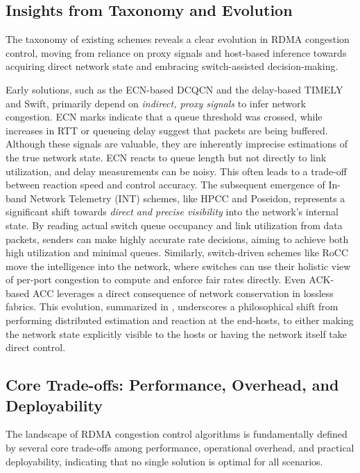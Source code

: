 \documentclass[11pt,en]{elegantpaper}
\begin{document}
\subsection{Insights from Taxonomy and Evolution}
\label{subsec:insights}

The taxonomy of existing schemes reveals a clear evolution in RDMA congestion control, moving from reliance on proxy signals and host-based inference towards acquiring direct network state and embracing switch-assisted decision-making.

Early solutions, such as the ECN-based DCQCN and the delay-based TIMELY and Swift, primarily depend on \textit{indirect, proxy signals} to infer network congestion. ECN marks indicate that a queue threshold was crossed, while increases in RTT or queueing delay suggest that packets are being buffered. Although these signals are valuable, they are inherently imprecise estimations of the true network state. ECN reacts to queue length but not directly to link utilization, and delay measurements can be noisy. This often leads to a trade-off between reaction speed and control accuracy. The subsequent emergence of In-band Network Telemetry (INT) schemes, like HPCC and Poseidon, represents a significant shift towards \textit{direct and precise visibility} into the network's internal state. By reading actual switch queue occupancy and link utilization from data packets, senders can make highly accurate rate decisions, aiming to achieve both high utilization and minimal queues. Similarly, switch-driven schemes like RoCC move the intelligence into the network, where switches can use their holistic view of per-port congestion to compute and enforce fair rates directly. Even ACK-based ACC leverages a direct consequence of network conservation in lossless fabrics. This evolution, summarized in , underscores a philosophical shift from performing distributed estimation and reaction at the end-hosts, to either making the network state explicitly visible to the hosts or having the network itself take direct control.

\subsection{Core Trade-offs: Performance, Overhead, and Deployability}
\label{subsec:trade-offs}

The landscape of RDMA congestion control algorithms is fundamentally defined by several core trade-offs among performance, operational overhead, and practical deployability, indicating that no single solution is optimal for all scenarios.
\end{document}
